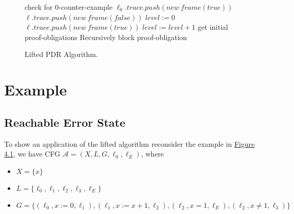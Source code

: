 \documentclass[11pt, a4paper, BCOR=10mm, ngerman]{scrbook}
\begin{document}
\begin{figure}[H]
\begin{algorithm}[H] 

\begin{algorithmic}[1]
\State check for 0-counter-example
\State $\ell_0.trace.push(new\ frame(true))$
        \State $\ell.trace.push(new\ frame(false))$
\EndFor
\State $level := 0$
\Statex
\Loop
                \State $\ell.trace.push(new\ frame(true))$
        \EndFor
        \State $level:= level + 1$
        \State get initial proof-obligations 
        \Statex
        \State Recursively block proof-obligation
        \EndIf
        \EndWhile

        \Statex 
                        \EndIf
                \EndFor
        \EndFor
\EndLoop
\EndProcedure
\end{algorithmic}
\end{algorithm}
\caption{Lifted PDR Algorithm.}
\end{figure}

\section{Example}
\subsection{Reachable Error State}
To show an application of the lifted algorithm reconsider the example in \hyperref[ex7]{Figure 4.1}, we have CFG  $\mathcal{A} = (X, L, G, \ell_0, \ell_E)$, where
\begin{itemize}
\item $X = \{x\}$
\item $L = \{\ell_0, \ell_1, \ell_2, \ell_3, \ell_E\}$
\item $G = \{(\ell_0, x := 0, \ell_1), (\ell_1, x := x + 1, \ell_2), (\ell_2, x = 1, \ell_E), (\ell_2, x \neq 1, \ell_3) \}$
\end{itemize}
\end{document}
